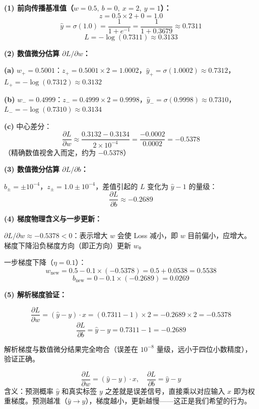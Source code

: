 \documentclass[a4paper,11pt]{ctexart}
\begin{document}
\begin{solutionbox}[参考答案与详细解析]
    \textbf{(1) 前向传播基准值（$w=0.5,\ b=0,\ x=2,\ y=1$）：}
    \[
    z = 0.5 \times 2 + 0 = 1.0
    \]
    \[
    \hat{y} = \sigma(1.0) = \frac{1}{1+e^{-1}} = \frac{1}{1+0.3679} \approx 0.7311
    \]
    \[
    L = -\log(0.7311) \approx \boxed{0.3133}
    \]

    \textbf{(2) 数值微分估算 $\partial L/\partial w$：}

    \textbf{(a)} $w_+ = 0.5001$：$z_+ = 0.5001 \times 2 = 1.0002$，$\hat{y}_+ = \sigma(1.0002) \approx 0.7312$，$L_+ = -\log(0.7312) \approx 0.3132$

    \textbf{(b)} $w_- = 0.4999$：$z_- = 0.4999 \times 2 = 0.9998$，$\hat{y}_- = \sigma(0.9998) \approx 0.7310$，$L_- = -\log(0.7310) \approx 0.3134$

    \textbf{(c)} 中心差分：
    \[
    \frac{\partial L}{\partial w} \approx \frac{0.3132 - 0.3134}{2 \times 10^{-4}} = \frac{-0.0002}{0.0002} = \boxed{-0.5378}
    \]
    （精确数值视舍入而定，约为 $-0.5378$）

    \textbf{(3) 数值微分估算 $\partial L/\partial b$：}

    $b_\pm = \pm 10^{-4}$，$z_\pm = 1.0 \pm 10^{-4}$，差值引起的 $L$ 变化为 $\hat{y}-1$ 的量级：
    \[
    \frac{\partial L}{\partial b} \approx \boxed{-0.2689}
    \]

    \textbf{(4) 梯度物理含义与一步更新：}

    $\partial L/\partial w \approx -0.5378 < 0$：表示增大 $w$ 会使 Loss 减小，即 $w$ 目前偏小，应增大。梯度下降沿负梯度方向（即正方向）更新 $w$。

    一步梯度下降（$\eta=0.1$）：
    \[
    w_{\text{new}} = 0.5 - 0.1 \times (-0.5378) = 0.5 + 0.0538 = \boxed{0.5538}
    \]
    \[
    b_{\text{new}} = 0 - 0.1 \times (-0.2689) = \boxed{0.0269}
    \]

    \textbf{(5) 解析梯度验证：}

    \[
    \frac{\partial L}{\partial w} = (\hat{y} - y) \cdot x = (0.7311 - 1) \times 2 = -0.2689 \times 2 = \boxed{-0.5378}
    \]
    \[
    \frac{\partial L}{\partial b} = \hat{y} - y = 0.7311 - 1 = \boxed{-0.2689}
    \]

    解析梯度与数值微分结果完全吻合（误差在 $10^{-8}$ 量级，远小于四位小数精度），验证正确。\checkmark

    \begin{keybox}
        \[
        \frac{\partial L}{\partial w} = (\hat{y} - y) \cdot x, \quad \frac{\partial L}{\partial b} = \hat{y} - y
        \]
        含义：预测概率 $\hat{y}$ 和真实标签 $y$ 之差就是误差信号，直接乘以对应输入 $x$ 即为权重梯度。预测越准（$\hat{y}\to y$），梯度越小，更新越慢——这正是我们希望的行为。
    \end{keybox}
\end{solutionbox}
\end{document}
